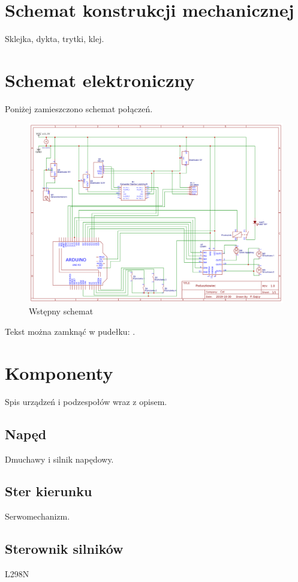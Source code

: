 \documentclass[../main.tex]{subfiles}
\begin{document}
\section{Schemat konstrukcji mechanicznej}
Sklejka, dykta, trytki, klej.

\section{Schemat elektroniczny}

Poniżej zamieszczono schemat połączeń.

\begin{figure}[h]
\centering
\includegraphics[width=1\textwidth]{./obrazy/schemat_aktualny.png}
\caption{Wstępny schemat}
\label{schemat_ogólny}
\end{figure}

Tekst można zamknąć w pudełku: .

\section{Komponenty}
Spis urządzeń i podzespołów wraz z opisem.

\subsection{Napęd}
Dmuchawy i silnik napędowy.

\subsection{Ster kierunku}
Serwomechanizm.

\subsection{Sterownik silników}
L298N
\end{document}
